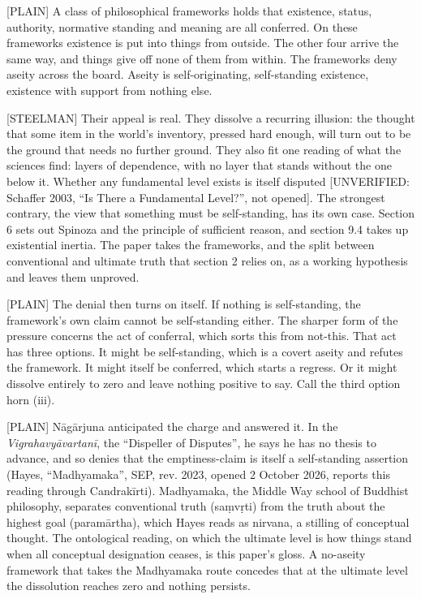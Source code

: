 \documentclass[11pt]{article}
\newcommand{\register}[1]{{\ttfamily\small #1}}
\begin{document}
\register{[PLAIN]} A class of philosophical frameworks holds that existence, status, authority, normative standing and meaning are all conferred. On these frameworks existence is put into things from outside. The other four arrive the same way, and things give off none of them from within. The frameworks deny aseity across the board. Aseity is self-originating, self-standing existence, existence with support from nothing else.

\register{[STEELMAN]} Their appeal is real. They dissolve a recurring illusion: the thought that some item in the world's inventory, pressed hard enough, will turn out to be the ground that needs no further ground. They also fit one reading of what the sciences find: layers of dependence, with no layer that stands without the one below it. Whether any fundamental level exists is itself disputed [UNVERIFIED: Schaffer 2003, ``Is There a Fundamental Level?'', not opened]. The strongest contrary, the view that something must be self-standing, has its own case. Section 6 sets out Spinoza and the principle of sufficient reason, and section 9.4 takes up existential inertia. The paper takes the frameworks, and the split between conventional and ultimate truth that section 2 relies on, as a working hypothesis and leaves them unproved.

\register{[PLAIN]} The denial then turns on itself. If nothing is self-standing, the framework's own claim cannot be self-standing either. The sharper form of the pressure concerns the act of conferral, which sorts this from not-this. That act has three options. It might be self-standing, which is a covert aseity and refutes the framework. It might itself be conferred, which starts a regress. Or it might dissolve entirely to zero and leave nothing positive to say. Call the third option horn (iii).

\register{[PLAIN]} Nāgārjuna anticipated the charge and answered it. In the \emph{Vigrahavyāvartanī}, the ``Dispeller of Disputes'', he says he has no thesis to advance, and so denies that the emptiness-claim is itself a self-standing assertion (Hayes, ``Madhyamaka'', SEP, rev. 2023, opened 2 October 2026, reports this reading through Candrakīrti). Madhyamaka, the Middle Way school of Buddhist philosophy, separates conventional truth (saṃvṛti) from the truth about the highest goal (paramārtha), which Hayes reads as nirvana, a stilling of conceptual thought. The ontological reading, on which the ultimate level is how things stand when all conceptual designation ceases, is this paper's gloss. A no-aseity framework that takes the Madhyamaka route concedes that at the ultimate level the dissolution reaches zero and nothing persists.
\end{document}
